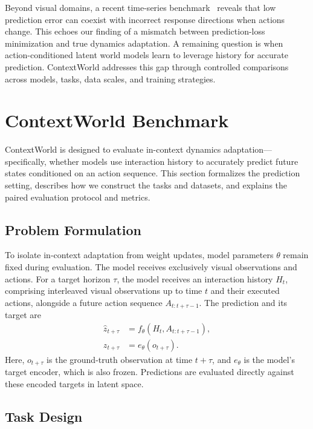 Beyond visual domains, a recent time-series benchmark~\cite{zhang2026mechanism} reveals that low prediction error can coexist with incorrect response directions when actions change.
This echoes our finding of a mismatch between prediction-loss minimization and true dynamics adaptation.
A remaining question is when action-conditioned latent world models learn to leverage history for accurate prediction.
ContextWorld addresses this gap through controlled comparisons across models, tasks, data scales, and training strategies.


\section{ContextWorld Benchmark}
\label{sec:benchmark}

ContextWorld is designed to evaluate in-context dynamics adaptation---specifically, whether models use interaction history to accurately predict future states conditioned on an action sequence.
This section formalizes the prediction setting, describes how we construct the tasks and datasets, and explains the paired evaluation protocol and metrics.

\subsection{Problem Formulation}
\label{sec:problem}

To isolate in-context adaptation from weight updates, model parameters $\theta$ remain fixed during evaluation.
The model receives exclusively visual observations and actions.
For a target horizon $\tau$, the model receives an interaction history $H_t$, comprising interleaved visual observations up to time $t$ and their executed actions, alongside a future action sequence $A_{t:t+\tau-1}$.
The prediction and its target are
\begin{equation}
\begin{aligned}
\hat z_{t+\tau} &= f_\theta(H_t,A_{t:t+\tau-1}),\\
z_{t+\tau} &= e_\theta(o_{t+\tau}).
\end{aligned}
\label{eq:prediction-setting}
\end{equation}
Here, $o_{t+\tau}$ is the ground-truth observation at time $t+\tau$, and $e_\theta$ is the model's target encoder, which is also frozen.
Predictions are evaluated directly against these encoded targets in latent space.


\subsection{Task Design}
\label{sec:tasks}

